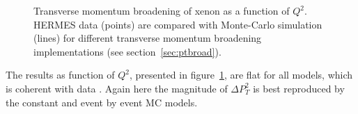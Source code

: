 \begin{figure}[tbp]
  \centering
{}
\caption {Transverse momentum broadening of xenon as a function of $Q^2$. 
HERMES data \cite{Airapetian:2009jy} (points) are compared with Monte-Carlo 
simulation (lines) for different transverse momentum broadening implementations 
(see section~\ref{sec:ptbroad}).}
\label{fig:PtC-PtQ2}
\end{figure}

The results as function of $Q^2$, presented in figure~\ref{fig:PtC-PtQ2}, are 
flat for all models, which is coherent with data \cite{Airapetian:2009jy}. 
Again here the magnitude of $\Delta P_T^2$ is best reproduced by the constant 
and event by event MC models.

